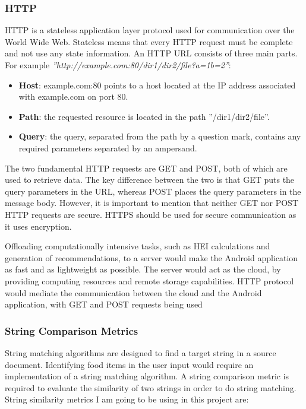 \documentclass{article}
\begin{document}
\subsubsection{HTTP}
HTTP is a stateless application layer protocol used for communication over the World Wide Web. Stateless means that every HTTP request must be complete and not use any state information. An HTTP URL consists of three main parts. For example \textit{”http://example.com:80/dir1/dir2/file?a=1b=2”}:

\begin{itemize}
    \item \textbf{Host}: example.com:80 points to a host located at the IP address associated with example.com on port 80.
    \item \textbf{Path}: the requested resource is located in the path ”/dir1/dir2/file”.
    \item \textbf{Query}: the query, separated from the path by a question mark, contains any required parameters separated by an ampersand.
\end{itemize}

\bigskip
\noindent The two fundamental HTTP requests are GET and POST, both of which are used to retrieve data.  The key difference between the two is that GET puts the query parameters in the URL, whereas POST places the query parameters in the message body. However, it is  important  to  mention  that  neither  GET  nor  POST  HTTP  requests  are secure.  HTTPS should be used for secure communication as it uses encryption. 

\bigskip 
\noindent Offloading computationally intensive tasks, such as HEI calculations and generation of recommendations, to a server would make the Android application as fast and as lightweight as possible. The server would act as the cloud, by providing computing resources and remote storage capabilities. HTTP protocol would mediate the communication between the cloud and the Android application, with GET and POST requests being used 

\subsubsection{String Comparison Metrics}
String matching algorithms are designed to find a target string in a source document. Identifying food items in the user input would require an implementation of a string matching algorithm. A string comparison metric is required to evaluate the similarity of two strings in order to do string matching. String similarity metrics I am going to be using in this project are: 
\end{document}
